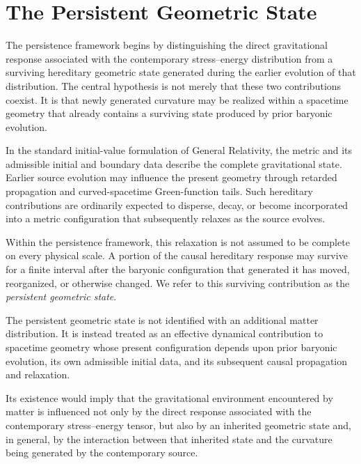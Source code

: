 \section{The Persistent Geometric State}
\label{sec:persistent-geometric-state}

The persistence framework begins by distinguishing the direct gravitational
response associated with the contemporary stress--energy distribution from a
surviving hereditary geometric state generated during the earlier evolution of
that distribution. The central hypothesis is not merely that these two
contributions coexist. It is that newly generated curvature may be realized
within a spacetime geometry that already contains a surviving state produced by
prior baryonic evolution.

In the standard initial-value formulation of General Relativity, the metric and
its admissible initial and boundary data describe the complete gravitational
state. Earlier source evolution may influence the present geometry through
retarded propagation and curved-spacetime Green-function tails. Such hereditary
contributions are ordinarily expected to disperse, decay, or become incorporated
into a metric configuration that subsequently relaxes as the source evolves.

Within the persistence framework, this relaxation is not assumed to be complete
on every physical scale. A portion of the causal hereditary response may survive
for a finite interval after the baryonic configuration that generated it has
moved, reorganized, or otherwise changed. We refer to this surviving
contribution as the \emph{persistent geometric state}.

The persistent geometric state is not identified with an additional matter
distribution. It is instead treated as an effective dynamical contribution to
spacetime geometry whose present configuration depends upon prior baryonic
evolution, its own admissible initial data, and its subsequent causal
propagation and relaxation.

Its existence would imply that the gravitational environment encountered by
matter is influenced not only by the direct response associated with the
contemporary stress--energy tensor, but also by an inherited geometric state and,
in general, by the interaction between that inherited state and the curvature
being generated by the contemporary source.

